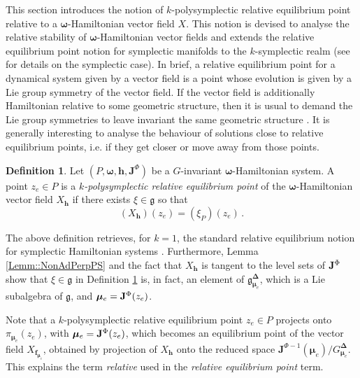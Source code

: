 \documentclass[11pt]{article}
\theoremstyle{plain}
\theoremstyle{definition}
\newtheorem{definition}[theorem]{Definition}
\newcommand{\bomega}{{\boldsymbol{\omega}}}
\newcommand{\bh}{{\boldsymbol{h}}}
\numberwithin{equation}{section}
\begin{document}
This section introduces the notion of $k$-polysymplectic relative equilibrium point relative to a $\bomega$-Hamiltonian vector field $X$. This notion is devised to analyse the relative stability of $\bomega$-Hamiltonian vector fields and extends the relative equilibrium point notion for symplectic manifolds to the $k$-symplectic realm (see \cite{AM_78} for details on the symplectic case). In brief, a relative equilibrium point for a dynamical system given by a vector field is a point whose evolution is given by a Lie group symmetry of the vector field. If the vector field is additionally Hamiltonian relative to some geometric structure, then it is usual to demand the Lie group symmetries to leave invariant the same geometric structure \cite{LMZ_23}. It is generally interesting to analyse the behaviour of solutions close to relative equilibrium points, i.e. if they get closer or move away from those points.



\begin{definition}
\label{Def::kEqPoint}
Let $(P,\bm\omega,\bh,\mathbf{J}^\Phi)$ be a $G$-invariant $\bomega$-Hamiltonian system. A point $z_e\in P$ is a {\it $k$-polysymplectic relative equilibrium point} of the $\bomega$-Hamiltonian vector field $X_\bh$ if there exists $\xi\in\mathfrak{g}$ so that
\begin{equation}
(X_{\bm h})(z_e)=(\xi_P)(z_e)\,.
\end{equation}
\end{definition}
The above definition retrieves, for $k=1$, the standard relative equilibrium notion for symplectic Hamiltonian systems \cite{AM_78}. Furthermore, Lemma \ref{Lemm::NonAdPerpPS} and the fact that $X_{\bh}$ is tangent to the level sets of ${\bf J}^{\Phi}$ show that $\xi\in\mathfrak{g}$ in Definition \ref{Def::kEqPoint} is, in fact, an element of $\mathfrak{g}^{\boldsymbol{\Delta}}_{\boldsymbol{\mu}_e}$, which is a Lie subalgebra of $\mathfrak{g}$, and ${\bm\mu_e}={\bf J}^\Phi(z_e)$.

Note that a $k$-polysymplectic relative equilibrium point $z_e\in P$ projects onto $\pi_{\boldsymbol{\mu}_e}(z_e)$, with $\boldsymbol{\mu}_e={\bf J}^\Phi(z_e)$, which becomes an equilibrium point of the vector field $X_{\boldsymbol{f}_{\boldsymbol{\mu}_e}}$, obtained by projection of $X_{\bh}$ onto the reduced space $\mathbf{J}^{\Phi-1}(\boldsymbol{\mu}_e)/G^{\boldsymbol{\Delta}}_{\boldsymbol{\mu}_e}$. This explains the term {\it relative} used in the \textit{relative equilibrium point} term.
\end{document}
